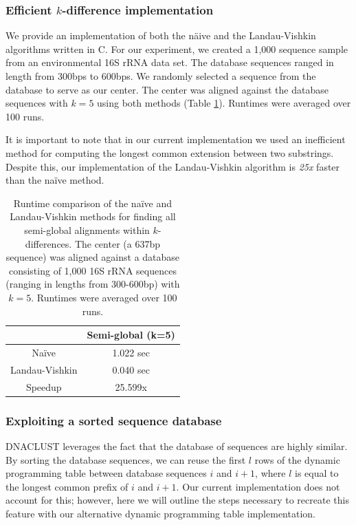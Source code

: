 
\subsubsection{Efficient $k$-difference implementation}
We provide an implementation of both the n\"aive and the Landau-Vishkin algorithms written in C.
For our experiment, we created a 1,000 sequence sample from an environmental 16S rRNA data set.
The database sequences ranged in length from 300bps to 600bps.
We randomly selected a sequence from the database to serve as our center. 
The center was aligned against the database sequences with $k=5$ using both methods (Table \ref{table:naive_vishkin}).
Runtimes were averaged over 100 runs.

It is important to note that in our current implementation we used an inefficient method for computing the longest common extension between two substrings.
Despite this, our implementation of the Landau-Vishkin algorithm is \emph{25x} faster than the na\"ive method.



\begin{center}
\begin{table}[tb]
\centering
\begin{tabular}{c|c}
               & Semi-global (k=5) \\
\hline 
Na\"ive          & 1.022 sec  \\
Landau-Vishkin & 0.040 sec \\
\hline 
Speedup        & 25.599x
\end{tabular}
\caption{Runtime comparison of the na\"ive and Landau-Vishkin\cite{landau_introducing_1986} methods for finding all semi-global alignments within $k$-differences. The center (a 637bp sequence) was aligned against a database consisting of 1,000 16S rRNA sequences (ranging in lengths from 300-600bp) with $k=5$.  Runtimes were averaged over 100 runs.}
\label{table:naive_vishkin}
\end{table}
\end{center}


\subsubsection{Exploiting a sorted sequence database}
DNACLUST leverages the fact that the database of sequences are highly similar.
By sorting the database sequences, we can reuse the first $l$ rows of the dynamic programming table between database sequences $i$ and $i+1$, where $l$ is equal to the longest common prefix of $i$ and $i+1$.
Our current implementation does not account for this; however, here we will outline the steps necessary to recreate this feature with our alternative dynamic programming table implementation.

